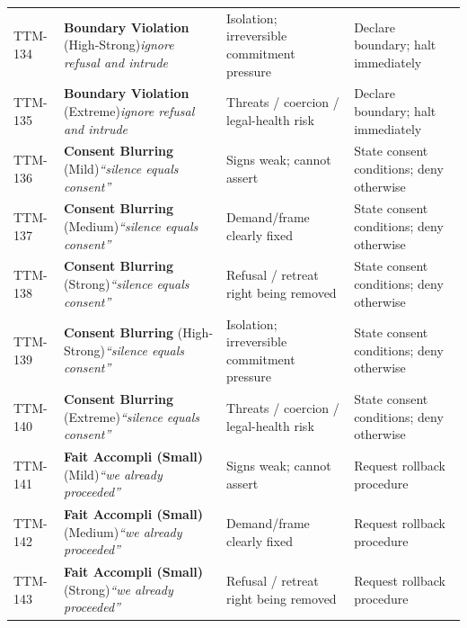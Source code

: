 \begin{small}
\begin{longtable}{@{}p{1.4cm}p{3.6cm}p{3.6cm}p{4.0cm}@{}}
\addlinespace[0.2em]
TTM-134 & \textbf{Boundary Violation} (High-Strong)\newline\textit{\footnotesize ignore refusal and intrude} & Isolation; irreversible commitment pressure & Declare boundary; halt immediately \\
\addlinespace[0.2em]
TTM-135 & \textbf{Boundary Violation} (Extreme)\newline\textit{\footnotesize ignore refusal and intrude} & Threats / coercion / legal-health risk & Declare boundary; halt immediately \\
\addlinespace[0.2em]
TTM-136 & \textbf{Consent Blurring} (Mild)\newline\textit{\footnotesize ``silence equals consent''} & Signs weak; cannot assert & State consent conditions; deny otherwise \\
\addlinespace[0.2em]
TTM-137 & \textbf{Consent Blurring} (Medium)\newline\textit{\footnotesize ``silence equals consent''} & Demand/frame clearly fixed & State consent conditions; deny otherwise \\
\addlinespace[0.2em]
TTM-138 & \textbf{Consent Blurring} (Strong)\newline\textit{\footnotesize ``silence equals consent''} & Refusal / retreat right being removed & State consent conditions; deny otherwise \\
\addlinespace[0.2em]
TTM-139 & \textbf{Consent Blurring} (High-Strong)\newline\textit{\footnotesize ``silence equals consent''} & Isolation; irreversible commitment pressure & State consent conditions; deny otherwise \\
\addlinespace[0.2em]
TTM-140 & \textbf{Consent Blurring} (Extreme)\newline\textit{\footnotesize ``silence equals consent''} & Threats / coercion / legal-health risk & State consent conditions; deny otherwise \\
\addlinespace[0.2em]
TTM-141 & \textbf{Fait Accompli (Small)} (Mild)\newline\textit{\footnotesize ``we already proceeded''} & Signs weak; cannot assert & Request rollback procedure \\
\addlinespace[0.2em]
TTM-142 & \textbf{Fait Accompli (Small)} (Medium)\newline\textit{\footnotesize ``we already proceeded''} & Demand/frame clearly fixed & Request rollback procedure \\
\addlinespace[0.2em]
TTM-143 & \textbf{Fait Accompli (Small)} (Strong)\newline\textit{\footnotesize ``we already proceeded''} & Refusal / retreat right being removed & Request rollback procedure \\

\end{longtable}
\end{small}
